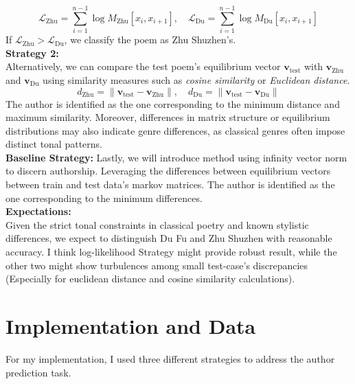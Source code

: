 \documentclass[12pt]{article}
\begin{document}
\[
    \mathcal{L}_{\text{Zhu}} = \sum_{i=1}^{n-1} \log M_{\text{Zhu}}[x_i, x_{i+1}], \quad \mathcal{L}_{\text{Du}} = \sum_{i=1}^{n-1} \log M_{\text{Du}}[x_i, x_{i+1}]
\]
If $\mathcal{L}_{\text{Zhu}} > \mathcal{L}_{\text{Du}}$, we classify the poem as Zhu Shuzhen's.
\\
\textbf{Strategy 2: }
\\
Alternatively, we can compare the test poem’s equilibrium vector $\mathbf{v}_{\text{test}}$ with $\mathbf{v}_{\text{Zhu}}$ and $\mathbf{v}_{\text{Du}}$ using similarity measures such as \textit{cosine similarity} or \textit{Euclidean distance}.
\[
    d_{\text{Zhu}} = \|\mathbf{v}_{\text{test}} - \mathbf{v}_{\text{Zhu}}\|, \quad d_{\text{Du}} = \|\mathbf{v}_{\text{test}} - \mathbf{v}_{\text{Du}}\|
\]
The author is identified as the one corresponding to the minimum distance and maximum similarity. Moreover, differences in matrix structure or equilibrium distributions may also indicate genre differences, as classical genres often impose distinct tonal patterns.
\\
\textbf{Baseline Strategy: }
Lastly, we will introduce method using infinity vector norm to discern authorship. Leveraging the differences between equilibrium vectors between train and test data's markov matrices.
The author is identified as the one corresponding to the minimum differences.
\\
\textbf{Expectations: }
\\
Given the strict tonal constraints in classical poetry and known stylistic differences, we expect to distinguish Du Fu and Zhu Shuzhen with reasonable accuracy. 
I think log-likelihood Strategy might provide robust result, while the other two might show turbulences among small test-case's discrepancies (Especially for euclidean distance and cosine similarity calculations).

\section{Implementation and Data}
\noindent For my implementation, I used three different strategies to address the author prediction task.
\end{document}
